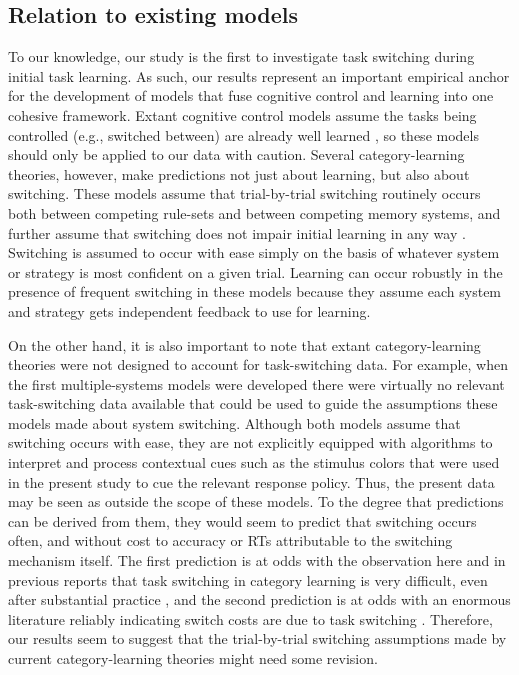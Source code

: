 \documentclass[doc, floatsintext]{apa7}
\begin{document}
\subsection{Relation to existing models}
To our knowledge, our study is the first to investigate task
switching during initial task learning. As such, our results
represent an important empirical anchor for the development
of models that fuse cognitive control and learning into one
cohesive framework. Extant cognitive control models assume
the tasks being controlled (e.g., switched between) are
already well learned \parencite{botvinick_conflict_2001,
blais_item-specific_2007, verguts_hebbian_2008,
abrahamse_grounding_2016}, so these models should only be
applied to our data with caution. Several category-learning
theories, however, make predictions not just about learning,
but also about switching. These models assume that
trial-by-trial switching routinely occurs both between
competing rule-sets and between competing memory systems,
and further assume that switching does not impair initial
learning in any way
\parencite{ashby_neuropsychological_1998,
erickson_rules_1998}. Switching is assumed to occur with
ease simply on the basis of whatever system or strategy is
most confident on a given trial. Learning can occur robustly
in the presence of frequent switching in these models
because they assume each system and strategy gets
independent feedback to use for learning.

On the other hand, it is also important to note that extant
category-learning theories were not designed to account for
task-switching data. For example, when the first
multiple-systems models were developed
\parencite{ashby_neuropsychological_1998,
erickson_rules_1998} there were virtually no relevant
task-switching data available that could be used to guide
the assumptions these models made about system switching.
Although both models assume that switching occurs with ease,
they are not explicitly equipped with algorithms to
interpret and process contextual cues such as the stimulus
colors that were used in the present study to cue the
relevant response policy. Thus, the present data may be seen
as outside the scope of these models. To the degree that
predictions can be derived from them, they would seem to
predict that switching occurs often, and without cost to
accuracy or RTs attributable to the switching mechanism
itself. The first prediction is at odds with the observation
here and in previous reports that task switching in category
learning is very difficult, even after substantial practice
\parencite{crossley_trial-by-trial_2018,
erickson_executive_2008, turner_hierarchical_2017}, and the
second prediction is at odds with an enormous literature
reliably indicating switch costs are due to task switching
\parencite{kiesel_control_2010, monsell_task_2003}.
Therefore, our results seem to suggest that the
trial-by-trial switching assumptions made by current
category-learning theories might need some revision. 
\end{document}
